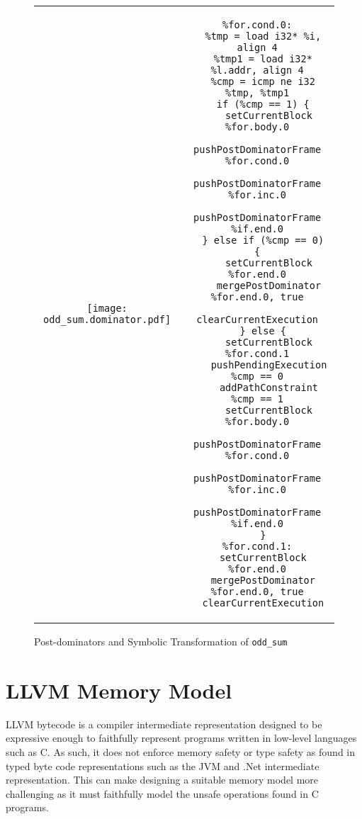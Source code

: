 \documentclass{article}
\begin{document}
\begin{figure}[tb]
\begin{center}
\begin{tabular}{cc}

\texttt{[image: odd\_sum.dominator.pdf]}

&
\begin{minipage}[b]{3in}
\small
\begin{verbatim}
%for.cond.0:
  %tmp = load i32* %i, align 4
  %tmp1 = load i32* %l.addr, align 4
  %cmp = icmp ne i32 %tmp, %tmp1
  if (%cmp == 1) {
    setCurrentBlock %for.body.0
    pushPostDominatorFrame %for.cond.0
    pushPostDominatorFrame %for.inc.0
    pushPostDominatorFrame %if.end.0
  } else if (%cmp == 0) {
    setCurrentBlock %for.end.0
    mergePostDominator %for.end.0, true
    clearCurrentExecution
  } else {
    setCurrentBlock %for.cond.1
    pushPendingExecution %cmp == 0
    addPathConstraint %cmp == 1
    setCurrentBlock %for.body.0
    pushPostDominatorFrame %for.cond.0
    pushPostDominatorFrame %for.inc.0
    pushPostDominatorFrame %if.end.0
  }
%for.cond.1:
  setCurrentBlock %for.end.0
  mergePostDominator %for.end.0, true
  clearCurrentExecution
\end{verbatim}
\end{minipage}
\end{tabular}
\end{center}
\caption{Post-dominators and Symbolic Transformation of \texttt{odd\_sum}}
  \label{figure:symbolic}
\end{figure}

\section{LLVM Memory Model}

LLVM bytecode is a compiler intermediate representation designed to be
expressive enough to faithfully represent programs written in low-level
languages such as C.  As such, it does not enforce memory safety or type safety
as found in typed byte code representations such as the JVM and .Net
intermediate representation.  This can make designing a suitable memory model
more challenging as it must faithfully model the unsafe operations found in C
programs.
\end{document}
